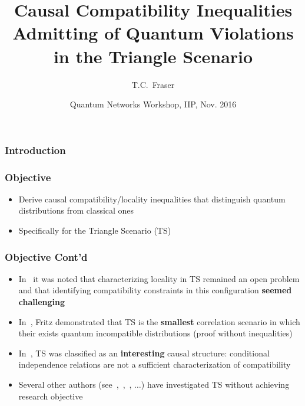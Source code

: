 \documentclass[
    hyperref={bookmarks=false},%
    xcolor={dvipsnames},
]{beamer}
\title[Triangle Inequalities]{Causal Compatibility Inequalities Admitting of Quantum Violations in the Triangle Scenario}
\author[Fraser]{T.C.~Fraser\inst{1,2}}
\institute
{
    \inst{1}%
    Perimeter Institute for Theoretical Physics\\
    Ontario, Canada \\
    \inst{2}%
    University of Waterloo\\
    Ontario, Canada \\
}
\date[QN 2016]{Quantum Networks Workshop, IIP, Nov. 2016}
\begin{document}
\frame{\titlepage}





\begin{frame}
    \frametitle{Introduction}
\end{frame}
\begin{frame}
    \frametitle{Objective}
    \begin{itemize}
        \item Derive causal compatibility/locality inequalities that distinguish quantum distributions from classical ones
        \item Specifically for the Triangle Scenario (TS)
    \end{itemize}
    \begin{center}
        \scalebox{1.0}{}
    \end{center}
\end{frame}

\begin{frame}
    \frametitle{Objective Cont'd}
    \begin{itemize}
        \item In~\cite{Branciard_2012} it was noted that characterizing locality in TS remained an open problem and that identifying compatibility constraints in this configuration \textbf{seemed challenging}
        \item In~\cite{Fritz_2012}, Fritz demonstrated that TS is the \textbf{smallest} correlation scenario in which their exists quantum incompatible distributions (proof without inequalities)
        \item In~\cite{Henson_2014}, TS was classified as an \textbf{interesting} causal structure: conditional independence relations are not a sufficient characterization of compatibility
        \item Several other authors (see~\cite{Steudel_2010},~\cite{Chaves_2014},~\cite{Inflation}, $\ldots$) have investigated TS without achieving research objective
    \end{itemize}
\end{frame}
\end{document}
